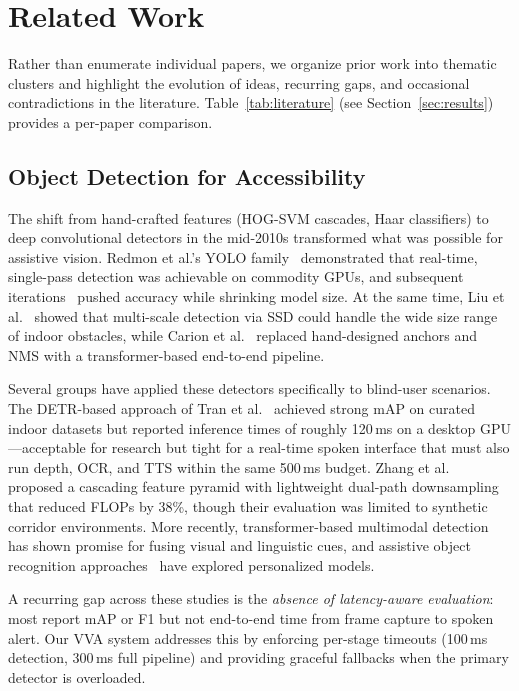 \section{Related Work}
\label{sec:related}

Rather than enumerate individual papers, we organize prior work into thematic clusters and highlight the evolution of ideas, recurring gaps, and occasional contradictions in the literature. Table~\ref{tab:literature} (see Section~\ref{sec:results}) provides a per-paper comparison.

\subsection{Object Detection for Accessibility}

The shift from hand-crafted features (HOG-SVM cascades, Haar classifiers) to deep convolutional detectors in the mid-2010s transformed what was possible for assistive vision. Redmon et al.'s YOLO family~\cite{redmon2016yolo} demonstrated that real-time, single-pass detection was achievable on commodity GPUs, and subsequent iterations~\cite{bochkovskiy2020yolov4, jocher2023yolov8} pushed accuracy while shrinking model size. At the same time, Liu et al.~\cite{liu2016ssd} showed that multi-scale detection via SSD could handle the wide size range of indoor obstacles, while Carion et al.~\cite{carion2020detr} replaced hand-designed anchors and NMS with a transformer-based end-to-end pipeline.

Several groups have applied these detectors specifically to blind-user scenarios. The DETR-based approach of Tran et al.~\cite{enhancing_detr_assistive2024} achieved strong mAP on curated indoor datasets but reported inference times of roughly 120\,ms on a desktop GPU---acceptable for research but tight for a real-time spoken interface that must also run depth, OCR, and TTS within the same 500\,ms budget. Zhang et al.~\cite{blind_aided_cascading2024} proposed a cascading feature pyramid with lightweight dual-path downsampling that reduced FLOPs by 38\%, though their evaluation was limited to synthetic corridor environments. More recently, transformer-based multimodal detection~\cite{transformer_multimodal_detection2024} has shown promise for fusing visual and linguistic cues, and assistive object recognition approaches~\cite{assistive_object_recognition2020} have explored personalized models.

A recurring gap across these studies is the \emph{absence of latency-aware evaluation}: most report mAP or F1 but not end-to-end time from frame capture to spoken alert. Our VVA system addresses this by enforcing per-stage timeouts (100\,ms detection, 300\,ms full pipeline) and providing graceful fallbacks when the primary detector is overloaded.


